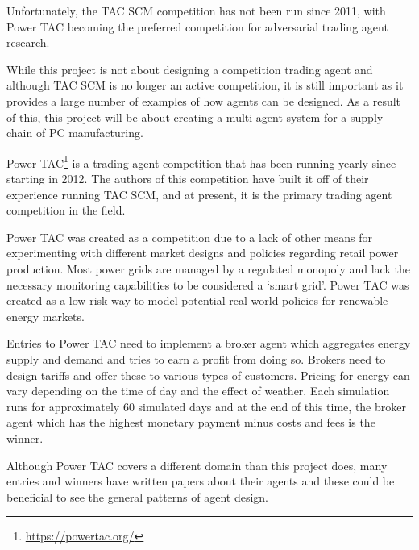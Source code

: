 Unfortunately, the TAC SCM competition has not been run since 2011, with Power TAC becoming the preferred competition for adversarial trading agent research.

While this project is not about designing a competition trading agent and although TAC SCM is no longer an active competition, it is still important as it provides a large number of examples of how agents can be designed.
As a result of this, this project will be about creating a multi-agent system for a supply chain of PC manufacturing.

Power TAC\footnote{\url{https://powertac.org/}} is a trading agent competition that has been running yearly since starting in 2012.
The authors of this competition have built it off of their experience running TAC SCM, and at present, it is the primary trading agent competition in the field.~\cite{ketter2013power}

Power TAC was created as a competition due to a lack of other means for experimenting with different market designs and policies regarding retail power production.
Most power grids are managed by a regulated monopoly and lack the necessary monitoring capabilities to be considered a `smart grid'.
Power TAC was created as a low-risk way to model potential real-world policies for renewable energy markets.~\cite{ketter2013power}

Entries to Power TAC need to implement a broker agent which aggregates energy supply and demand and tries to earn a profit from doing so.
Brokers need to design tariffs and offer these to various types of customers.
Pricing for energy can vary depending on the time of day and the effect of weather.
Each simulation runs for approximately 60 simulated days and at the end of this time, the broker agent which has the highest monetary payment minus costs and fees is the winner.~\cite{ketter2020power}

Although Power TAC covers a different domain than this project does, many entries and winners have written papers about their agents and these could be beneficial to see the general patterns of agent design.
